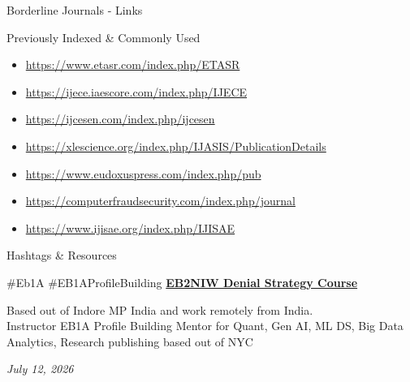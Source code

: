 \documentclass{beamer}
\begin{document}
	\begin{frame}{Borderline Journals - Links}
		\begin{block}{Previously Indexed \& Commonly Used}
			\begin{itemize}
				\item \href{https://www.etasr.com/index.php/ETASR}{https://www.etasr.com/index.php/ETASR}
				\item \href{https://ijece.iaescore.com/index.php/IJECE}{https://ijece.iaescore.com/index.php/IJECE}
				\item \href{https://ijcesen.com/index.php/ijcesen}{https://ijcesen.com/index.php/ijcesen}
				\item \href{https://xlescience.org/index.php/IJASIS/PublicationDetails}{https://xlescience.org/index.php/IJASIS/PublicationDetails}
				\item \href{https://www.eudoxuspress.com/index.php/pub}{https://www.eudoxuspress.com/index.php/pub}
				\item \href{https://computerfraudsecurity.com/index.php/journal}{https://computerfraudsecurity.com/index.php/journal}
				\item \href{https://www.ijisae.org/index.php/IJISAE}{https://www.ijisae.org/index.php/IJISAE}
			\end{itemize}
		\end{block}
	\end{frame}
	
	\begin{frame}{Hashtags \& Resources}
		\begin{center}
			\#Eb1A \#EB1AProfileBuilding
			\vspace{0.5cm}
			\href{https://www.udemy.com/course/eb2niw-denial-strategy-mtr-foia-mandamus-apa-long-game/?referralCode=46A660578A4360A1DC8E}{\Large \textbf{EB2NIW Denial Strategy Course}}
			\vspace{0.5cm}
			\begin{block}{}
				\centering
				Based out of Indore MP India and work remotely from India.\\
				Instructor EB1A Profile Building Mentor for Quant, Gen AI, ML DS, Big Data Analytics, Research publishing based out of NYC
			\end{block}
			\vspace{0.3cm}
			\textit{July 12, 2026}
		\end{center}
	\end{frame}
	
\end{document}
